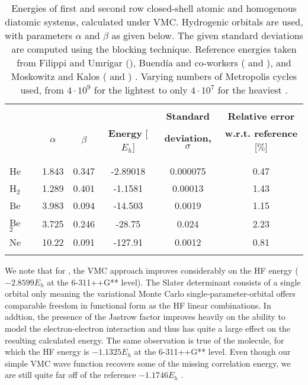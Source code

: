 \documentclass[../../master.tex]{subfiles}
\begin{document}
\begin{table}
\centering{}
\setlength\extrarowheight{2pt}
\begin{tabularx}{\textwidth}{X  *{6}{S[table-format=-1.3,table-space-text-post=***]}}
\hline
\hline
\\[-0.9em]
        &  &           &          &                         & \phantom{-}\textbf{Standard} & \phantom{.}\textbf{Relative error}    \\
        &  &  $\alpha$ & $\beta$  & \textbf{Energy} [$E_h$] & \textbf{deviation, } $\sigma$ & \textbf{w.r.t. reference } [$\%$]             \\
\\[-0.9em]
\hline
\\[-0.9em]
He       & & 1.843  & 0.347  & -2.89018  & 0.000075  & 0.47 \\
H${}_2$  & & 1.289  & 0.401  & -1.1581   & 0.00013   & 1.43 \\ 
Be       & & 3.983  & 0.094  & -14.503   & 0.0019    & 1.15 \\
Be${}_2$ & & 3.725  & 0.246  & -28.75    & 0.024     & 2.23 \\ 
Ne       & & 10.22  & 0.091  & -127.91   & 0.0012    & 0.81 \\ 
\\[-0.9em]
\hline
\end{tabularx}
\caption{Energies of first and second row closed-shell atomic and homogenous diatomic systems, calculated under VMC. Hydrogenic orbitals are used, with parameters $\alpha$ and $\beta$ as given below. The given standard deviations are computed using the blocking technique. Reference energies taken from Filippi and Umrigar (), Buendía and co-workers ( and ), and Moskowitz and Kalos ( and ) \cite{umrigar,buendia,moskowitz1981new}. Varying numbers of Metropolis cycles used, from $4\cdot10^9$ for the lightest  to only $4\cdot10^7$ for the heaviest . \label{tab:vmcval}}
\end{table}

We note that for , the VMC approach improves considerably on the HF energy ($-2.8599 E_h$ at the 6-311++G** level). The Slater determinant consists of a single orbital only meaning the variational Monte Carlo single-parameter-orbital offers comparable freedom in functional form as the HF linear combinations. In addtion, the presence of the Jastrow factor improves heavily on the ability to model the electron-electron interaction and thus has quite a large effect on the resulting calculated energy. The same observation is true of the  molecule, for which the HF energy is $-1.1325 E_h$ at the 6-311++G** level. Even though our simple VMC wave function recovers some of the missing correlation energy, we are still quite far off of the reference $-1.1746 E_h$ \cite{moskowitz1981new}.
\end{document}
